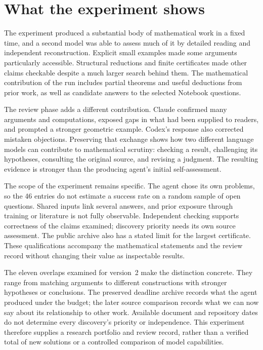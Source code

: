 \section{What the experiment shows}
\label{sec:discussion}

The experiment produced a substantial body of mathematical work in a
fixed time, and a second model was able to assess much of it by detailed
reading and independent reconstruction. Explicit small examples made
some arguments particularly accessible. Structural reductions and finite
certificates made other claims checkable despite a much larger search
behind them. The mathematical contribution of the run includes partial
theorems and useful deductions from prior work, as well as candidate
answers to the selected Notebook questions.

The review phase adds a different contribution. Claude confirmed many
arguments and computations, exposed gaps in what had been supplied to
readers, and prompted a stronger geometric example. Codex's response
also corrected mistaken objections. Preserving that exchange shows how
two different language models can contribute to mathematical scrutiny:
checking a result, challenging its hypotheses, consulting the original
source, and revising a judgment. The resulting evidence is stronger than
the producing agent's initial self-assessment.

The scope of the experiment remains specific. The agent chose its own
problems, so the 46 entries do not estimate a success rate on a random
sample of open questions. Shared inputs link several answers, and
prior exposure through training or literature is not fully observable.
Independent checking supports correctness of the claims examined;
discovery priority needs its own source assessment. The public archive
also has a stated limit for the largest certificate. These qualifications
accompany the mathematical statements and the review record without
changing their value as inspectable results.

The eleven overlaps examined for version~2 make the distinction concrete.
They range from matching arguments to different constructions with
stronger hypotheses or conclusions. The preserved deadline archive
records what the agent produced under the budget; the later source
comparison records what we can now say about its relationship to other
work. Available document and repository dates do not determine every
discovery's priority or independence. This experiment therefore supplies
a research portfolio and review record, rather than a verified total of
new solutions or a controlled comparison of model capabilities.

